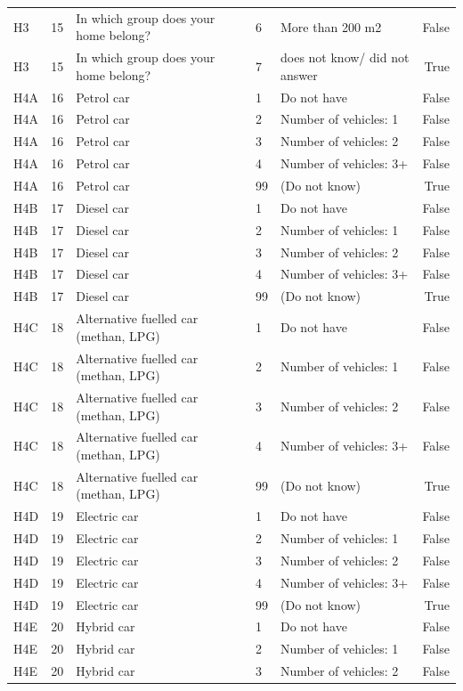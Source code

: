 \begin{tabular}{lrlllr}
H3 & 15 & In which group does your home belong? & 6 & More than 200 m2 & False \\
H3 & 15 & In which group does your home belong? & 7 & does not know/ did not answer & True \\
H4A & 16 & Petrol car & 1 & Do not have & False \\
H4A & 16 & Petrol car & 2 & Number of vehicles: 1 & False \\
H4A & 16 & Petrol car & 3 & Number of vehicles: 2 & False \\
H4A & 16 & Petrol car & 4 & Number of vehicles: 3+ & False \\
H4A & 16 & Petrol car & 99 & (Do not know) & True \\
H4B & 17 & Diesel car & 1 & Do not have & False \\
H4B & 17 & Diesel car & 2 & Number of vehicles: 1 & False \\
H4B & 17 & Diesel car & 3 & Number of vehicles: 2 & False \\
H4B & 17 & Diesel car & 4 & Number of vehicles: 3+ & False \\
H4B & 17 & Diesel car & 99 & (Do not know) & True \\
H4C & 18 & Alternative fuelled car (methan, LPG) & 1 & Do not have & False \\
H4C & 18 & Alternative fuelled car (methan, LPG) & 2 & Number of vehicles: 1 & False \\
H4C & 18 & Alternative fuelled car (methan, LPG) & 3 & Number of vehicles: 2 & False \\
H4C & 18 & Alternative fuelled car (methan, LPG) & 4 & Number of vehicles: 3+ & False \\
H4C & 18 & Alternative fuelled car (methan, LPG) & 99 & (Do not know) & True \\
H4D & 19 & Electric car & 1 & Do not have & False \\
H4D & 19 & Electric car & 2 & Number of vehicles: 1 & False \\
H4D & 19 & Electric car & 3 & Number of vehicles: 2 & False \\
H4D & 19 & Electric car & 4 & Number of vehicles: 3+ & False \\
H4D & 19 & Electric car & 99 & (Do not know) & True \\
H4E & 20 & Hybrid car & 1 & Do not have & False \\
H4E & 20 & Hybrid car & 2 & Number of vehicles: 1 & False \\
H4E & 20 & Hybrid car & 3 & Number of vehicles: 2 & False \\

\end{tabular}
